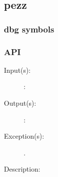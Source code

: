 %
%
%
%
%              

\label{pezz}
\subsection{pezz}

\subsubsection{dbg symbols}

\subsubsection{API}
\begin{description}
\label{pezz_}
\item[{\cfunc[]{pezz\_}{}}: ]
	\begin{description}\item[]
	\item[Input(s): ]
		\begin{description}\item[]
		\item[: ]
		\end{description}
	\item[Output(s): ]
		\begin{description}\item[]
		\item[: ]
		\end{description}
	\item[Exception(s): ]
		\begin{description}\item[]
		\item[.]
		\end{description}
	\item[Description: ]
	\end{description}
\end{description}
